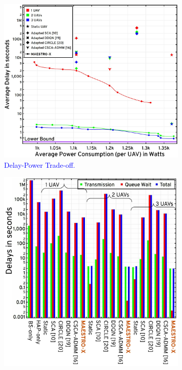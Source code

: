 \documentclass[12pt, draftcls, onecolumn]{IEEEtran}
\theoremstyle{plain}
\theoremstyle{definition}
\theoremstyle{remark}
\newcommand\hlt[1]{\textcolor{blue}{#1}}
\begin{document}
\begin{figure} [t]
     \begin{subfigure}{0.55\linewidth}
         \centering
         \includegraphics[width=1.0\linewidth]{figs/Delay_Power_10Mb_Scatter_High_Congestion.jpg}
         \caption{\hlt{Delay-Power Trade-off.}}
         \label{F8a}
     \end{subfigure}
     \begin{subfigure}{0.448\linewidth}
         \centering
         \includegraphics[width=1.0\linewidth]{figs/Delay_Power_10Mb_Chart_High_Congestion.jpeg}

\end{subfigure}
\end{figure}
\end{document}
